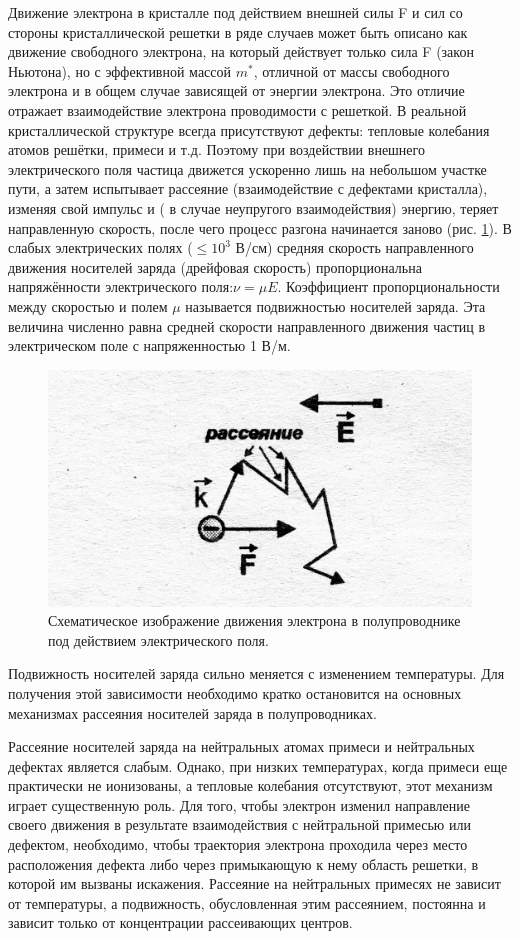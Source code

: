 Движение электрона в кристалле под действием внешней силы F и сил со стороны кристаллической решетки в ряде случаев
может быть описано как движение свободного электрона, на который действует только сила F (закон Ньютона), но с
эффективной массой $m^*$, отличной от массы свободного электрона и в общем случае зависящей от энергии электрона. Это
отличие отражает взаимодействие электрона проводимости с решеткой. 
В реальной кристаллической структуре всегда присутствуют дефекты: тепловые колебания атомов решётки, примеси и т.д.
Поэтому при воздействии внешнего электрического поля частица движется ускоренно лишь на небольшом участке пути, а затем
испытывает рассеяние (взаимодействие с дефектами кристалла), изменяя свой импульс и ( в случае неупругого
взаимодействия) энергию, теряет направленную скорость, после чего процесс разгона начинается заново (рис. \ref{fig:3.1}). В слабых
электрических полях ($\leq 10^3$ В/см) средняя скорость направленного движения носителей заряда (дрейфовая скорость)
пропорциональна напряжённости электрического поля:$\nu = \mu E$. Коэффициент пропорциональности между скоростью и полем $\mu$
называется подвижностью носителей заряда. Эта величина численно равна средней скорости направленного движения частиц в
электрическом поле с напряженностью 1 В/м. 

\begin{figure}[h!]
	\centering
	\includegraphics[width = .5\linewidth]{img/31.jpg}
	\caption{Схематическое изображение движения электрона в полупроводнике под действием электрического поля.}
	\label{fig:3.1}
\end{figure}

Подвижность носителей заряда сильно меняется с изменением температуры. Для получения этой зависимости необходимо кратко
остановится на основных механизмах рассеяния носителей заряда в полупроводниках. 

Рассеяние носителей заряда на нейтральных атомах примеси и нейтральных дефектах является слабым. Однако, при низких
температурах, когда примеси еще практически не ионизованы, а тепловые колебания отсутствуют, этот механизм играет
существенную роль. Для того, чтобы электрон изменил направление своего движения в результате взаимодействия с
нейтральной примесью или дефектом, необходимо, чтобы траектория электрона проходила через место расположения дефекта
либо через примыкающую к нему область решетки, в которой им вызваны искажения. Рассеяние на нейтральных примесях не
зависит от температуры, а подвижность, обусловленная этим рассеянием, постоянна и зависит только от концентрации
рассеивающих центров.

